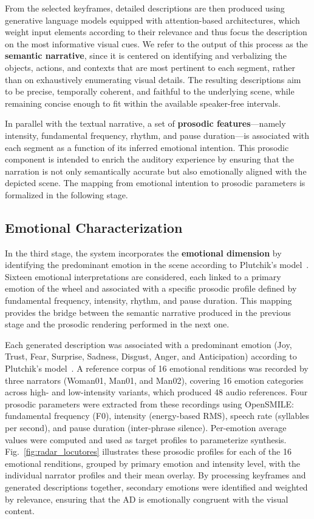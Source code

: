 \documentclass[pdflatex,iicol,sn-mathphys-num]{sn-jnl}%
\theoremstyle{thmstyleone}%
\theoremstyle{thmstyletwo}%
\theoremstyle{thmstylethree}%
\begin{document}
From the selected keyframes, detailed descriptions are then produced using generative language models equipped with attention-based architectures, which weight input elements according to their relevance and thus focus the description on the most informative visual cues. We refer to the output of this process as the \textbf{semantic narrative}, since it is centered on identifying and verbalizing the objects, actions, and contexts that are most pertinent to each segment, rather than on exhaustively enumerating visual details. The resulting descriptions aim to be precise, temporally coherent, and faithful to the underlying scene, while remaining concise enough to fit within the available speaker-free intervals.

In parallel with the textual narrative, a set of \textbf{prosodic features}—namely intensity, fundamental frequency, rhythm, and pause duration—is associated with each segment as a function of its inferred emotional intention. This prosodic component is intended to enrich the auditory experience by ensuring that the narration is not only semantically accurate but also emotionally aligned with the depicted scene. The mapping from emotional intention to prosodic parameters is formalized in the following stage.

\subsection{Emotional Characterization}
\label{subsec:emotional}

In the third stage, the system incorporates the \textbf{emotional dimension} by identifying the predominant emotion in the scene according to Plutchik's model~\cite{Plutchik2001,Plutchik1989}. Sixteen emotional interpretations are considered, each linked to a primary emotion of the wheel and associated with a specific prosodic profile defined by fundamental frequency, intensity, rhythm, and pause duration. This mapping provides the bridge between the semantic narrative produced in the previous stage and the prosodic rendering performed in the next one.

Each generated description was associated with a predominant emotion (Joy, Trust, Fear, Surprise, Sadness, Disgust, Anger, and Anticipation) according to Plutchik's model~\cite{Plutchik2001}. A reference corpus of 16 emotional renditions was recorded by three narrators (Woman01, Man01, and Man02), covering 16 emotion categories across high- and low-intensity variants, which produced 48 audio references. Four prosodic parameters were extracted from these recordings using OpenSMILE: fundamental frequency (F0), intensity (energy-based RMS), speech rate (syllables per second), and pause duration (inter-phrase silence). Per-emotion average values were computed and used as target profiles to parameterize synthesis. Fig.~\ref{fig:radar_locutores} illustrates these prosodic profiles for each of the 16 emotional renditions, grouped by primary emotion and intensity level, with the individual narrator profiles and their mean overlay. By processing keyframes and generated descriptions together, secondary emotions were identified and weighted by relevance, ensuring that the AD is emotionally congruent with the visual content.
\end{document}
